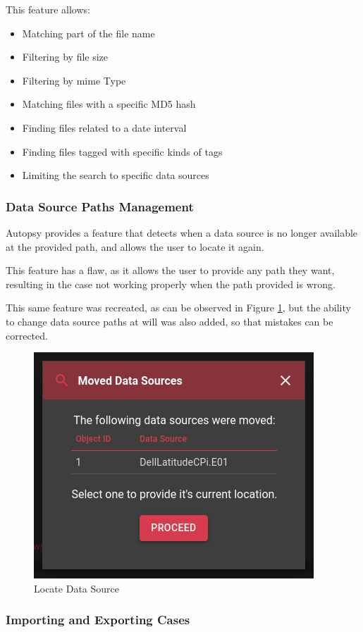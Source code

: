 This feature allows:

\begin{itemize}
 \item Matching part of the file name
 \item Filtering by file size
 \item Filtering by \acrshort{mime} Type
 \item Matching files with a specific MD5 hash
 \item Finding files related to a date interval
 \item Finding files tagged with specific kinds of tags
 \item Limiting the search to specific data sources
\end{itemize}

\subsubsection*{Data Source Paths Management}

Autopsy provides a feature that detects when a data source is no longer available at the provided path, and allows the user to locate it again.

This feature has a flaw, as it allows the user to provide any path they want, resulting in the case not working properly when the path provided is wrong.

This same feature was recreated, as can be observed in Figure \ref{fig:locate}, but the ability to change data source paths at will was also added, so that mistakes can be corrected.

\begin{figure}[ht]
 \centering
 \includegraphics[width=0.6\linewidth]{imgs/locate.png}
 \caption{Locate Data Source}
 \label{fig:locate}
\end{figure}

\subsubsection*{Importing and Exporting Cases}


